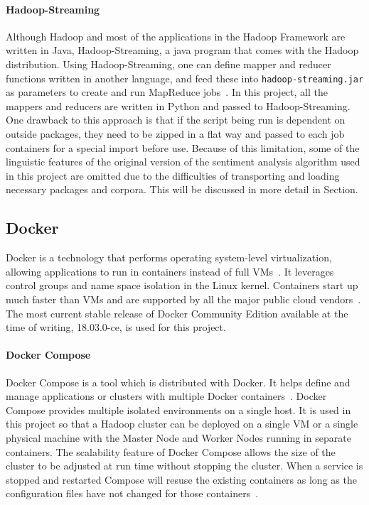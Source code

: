 \paragraph{Hadoop-Streaming} Although Hadoop and most of the
applications in the Hadoop Framework are written in Java,
Hadoop-Streaming, a java program that comes with the Hadoop
distribution. Using Hadoop-Streaming, one can define mapper and
reducer functions written in another language, and feed these
into \verb|hadoop-streaming.jar| as parameters to create and run
MapReduce jobs~\cite{hid-sp18-405-hadoop-streaming}. In this project,
all the mappers and reducers are written in Python and passed to
Hadoop-Streaming. One drawback to this approach is that if the script
being run is dependent on outside packages, they need to be zipped in
a flat way and passed to each job containers for a special import
before use.  Because of this limitation, some of the linguistic
features of the original version of the sentiment analysis algorithm
used in this project are omitted due to the difficulties of
transporting and loading necessary packages and corpora. This will be
discussed in more detail in Section\label{s:algorithm}.


\subsection{Docker}
Docker is a technology that performs operating system-level
virtualization, allowing applications to run in containers instead of
full VMs~\cite{hid-sp18-405-docker-wiki}. It leverages control groups
and name space isolation in the Linux kernel. Containers start up much
faster than VMs and are supported by all the major public cloud
vendors~\cite{Foster:2017:CCS:3158276}. The most current stable
release of Docker Community Edition available at the time of writing,
18.03.0-ce, is used for this project.

\paragraph{Docker Compose} Docker Compose is a tool which is distributed
with Docker. It helps define and manage applications or clusters with
multiple Docker
containers~\cite{hid-sp18-405-docker-compose-doc}. Docker Compose
provides multiple isolated environments on a single host. It is used
in this project so that a Hadoop cluster can be deployed on a single
VM or a single physical machine with the Master Node and Worker Nodes
running in separate containers. The scalability feature of Docker
Compose allows the size of the cluster to be adjusted at run time
without stopping the cluster. When a service is stopped and restarted
Compose will resuse the existing containers as long as the
configuration files have not changed for those
containers~\cite{hid-sp18-405-docker-compose-doc}.


